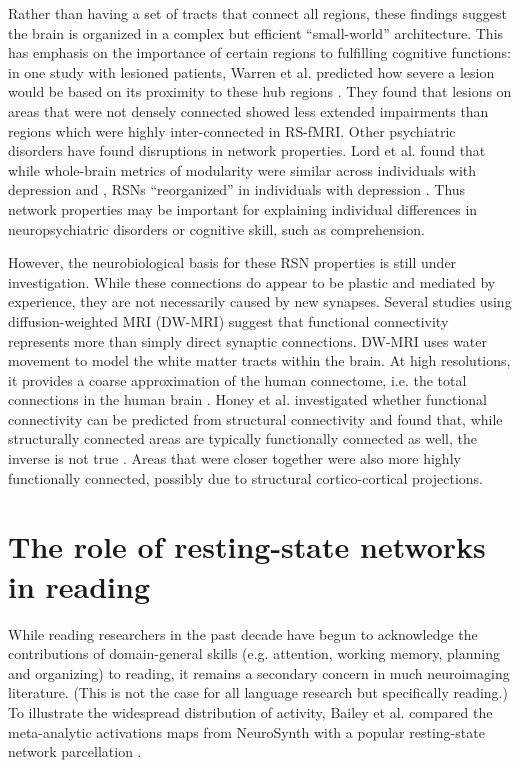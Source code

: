Rather than having a set of tracts that connect all regions, these findings suggest the brain is organized in a complex but efficient ``small-world'' architecture. This has emphasis on the importance of certain regions to fulfilling cognitive functions: in one study with lesioned patients, Warren et al. predicted how severe a lesion would be based on its proximity to these hub regions \citep{Warren2014}. They found that lesions on areas that were not densely connected showed less extended impairments than regions which were highly inter-connected in RS-fMRI. Other psychiatric disorders have found disruptions in network properties. Lord et al. found that while whole-brain metrics of modularity were similar across individuals with depression and , RSNs ``reorganized'' in individuals with depression \citep{Lord2012}. Thus network properties may be important for explaining individual differences in neuropsychiatric disorders or cognitive skill, such as comprehension. 

However, the neurobiological basis for these RSN properties is still under investigation. While these connections do appear to be plastic and mediated by experience, they are not necessarily caused by new synapses. Several studies using diffusion-weighted MRI (DW-MRI) suggest that functional connectivity represents more than simply direct synaptic connections. DW-MRI uses water movement to model the white matter tracts within the brain. At high resolutions, it provides a coarse approximation of the human connectome, i.e. the total connections in the human brain \citep{Sporns2005}. Honey et al. investigated whether functional connectivity can be predicted from structural connectivity and found that, while structurally connected areas are typically functionally connected as well, the inverse is not true \citep{Honey2009}. Areas that were closer together were also more highly functionally connected, possibly due to structural cortico-cortical projections. 

\section{The role of resting-state networks in reading}
While reading researchers in the past decade have begun to acknowledge the contributions of domain-general skills (e.g. attention, working memory, planning and organizing) to reading, it remains a secondary concern in much neuroimaging literature. (This is not the case for all language research but specifically reading.) To illustrate the widespread distribution of activity, Bailey et al. compared the meta-analytic activations maps from NeuroSynth with a popular resting-state network parcellation \citep{Bailey2018}. 

